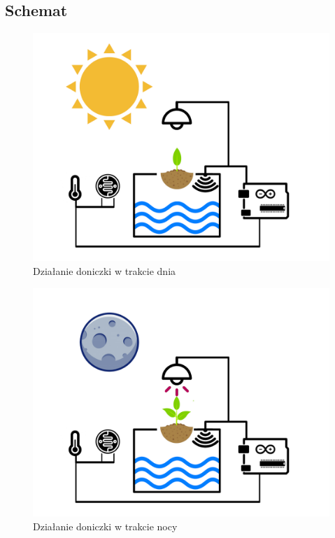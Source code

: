 \documentclass[a4paper,11pt]{uzreport}
\begin{document}
\subsection{Schemat}
\begin{multicols}{2}
\begin{figure}[H]
    \centering
	     \includegraphics[width=\linewidth]{listings/doniczka_dzien.png}
    \caption{Działanie doniczki w trakcie dnia}
    \label{fig:my_label}
\end{figure}
\begin{figure}[H]
    \centering
		 \includegraphics[width=\linewidth]{listings/doniczka_noc.png}
    \caption{Działanie doniczki w trakcie nocy}
    \label{fig:my_label}
\end{figure}
\end{multicols}
\end{document}
